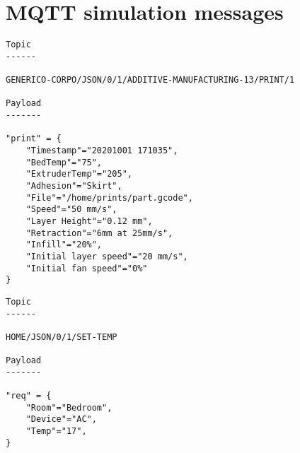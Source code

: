 \chapter{MQTT simulation messages}\label{appendix:mqtt_message}

\begin{lstlisting}[caption = {The message payload and topic used to transmit for the printer farm scenario.}, label={lst:msg_farm}]
Topic
------

GENERICO-CORPO/JSON/0/1/ADDITIVE-MANUFACTURING-13/PRINT/1

Payload
-------

"print" = {
    "Timestamp"="20201001 171035",
    "BedTemp"="75",
    "ExtruderTemp"="205",
    "Adhesion"="Skirt",
    "File"="/home/prints/part.gcode",
    "Speed"="50 mm/s",
    "Layer Height"="0.12 mm",
    "Retraction"="6mm at 25mm/s",
    "Infill"="20%",
    "Initial layer speed"="20 mm/s",
    "Initial fan speed"="0%"
}
\end{lstlisting}

\begin{lstlisting}[caption = {The message payload and topic used to transmit for the printer home scenario.}, label={lst:msg_farm}]
Topic
------

HOME/JSON/0/1/SET-TEMP

Payload
-------

"req" = {
    "Room"="Bedroom",
    "Device"="AC",
    "Temp"="17",
}
\end{lstlisting}